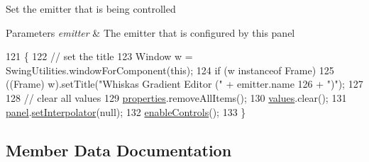 Set the emitter that is being controlled


\begin{DoxyParams}{Parameters}
{\em emitter} & The emitter that is configured by this panel \\
\hline
\end{DoxyParams}

\begin{DoxyCode}
121                                                               \{
122         \textcolor{comment}{// set the title}
123         Window w = SwingUtilities.windowForComponent(\textcolor{keyword}{this});
124         \textcolor{keywordflow}{if} (w instanceof Frame)
125             ((Frame) w).setTitle(\textcolor{stringliteral}{"Whiskas Gradient Editor ("} + emitter.name
126                     + \textcolor{stringliteral}{")"});
127 
128         \textcolor{comment}{// clear all values}
129         \mbox{\hyperlink{classorg_1_1newdawn_1_1slick_1_1tools_1_1peditor_1_1_graph_editor_window_ac9d1313ef13023ef8d250b689e52ff12}{properties}}.removeAllItems();
130         \mbox{\hyperlink{classorg_1_1newdawn_1_1slick_1_1tools_1_1peditor_1_1_graph_editor_window_a14eef550e2a6dd21ddb25d4fdec6945c}{values}}.clear();
131         \mbox{\hyperlink{classorg_1_1newdawn_1_1slick_1_1tools_1_1peditor_1_1_graph_editor_window_ac332b313a344ef1a5becf8e6075dc70b}{panel}}.\mbox{\hyperlink{classorg_1_1newdawn_1_1slick_1_1tools_1_1peditor_1_1_graph_editor_window_1_1_graph_panel_a290757906b8a1372930a6d0f29f886da}{setInterpolator}}(null);
132         \mbox{\hyperlink{classorg_1_1newdawn_1_1slick_1_1tools_1_1peditor_1_1_graph_editor_window_a202a76d9a06ddca4e7c11686f1bfcee6}{enableControls}}();
133     \}
\end{DoxyCode}


\subsection{Member Data Documentation}
\mbox{\label{classorg_1_1newdawn_1_1slick_1_1tools_1_1peditor_1_1_graph_editor_window_a1100870952be1cf64f2b4b6818c0422d}} 
